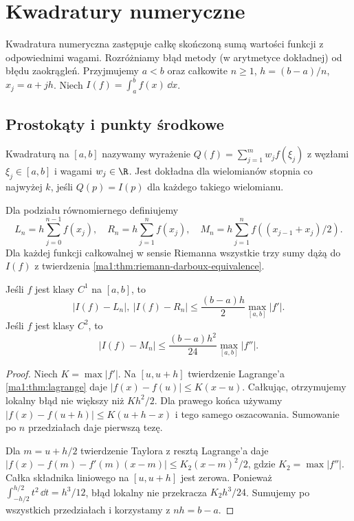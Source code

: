 \chapter{Kwadratury numeryczne}
\label{ma1:ch:numerical-quadrature}

Kwadratura numeryczna zastępuje całkę skończoną sumą wartości funkcji z odpowiednimi wagami. Rozróżniamy błąd metody (w arytmetyce dokładnej) od błędu zaokrągleń. Przyjmujemy $a<b$ oraz całkowite $n\ge1$, $h=(b-a)/n$, $x_j=a+jh$. Niech $I(f)=\int_a^b f(x)\,\dd x$.

\section{Prostokąty i punkty środkowe}
\begin{definicja}
\label{ma1:def:quadrature}
Kwadraturą na $[a,b]$ nazywamy wyrażenie $Q(f)=\sum_{j=1}^m w_j f(\xi_j)$ z węzłami $\xi_j\in[a,b]$ i wagami $w_j\in\R$. Jest dokładna dla wielomianów stopnia co najwyżej $k$, jeśli $Q(p)=I(p)$ dla każdego takiego wielomianu.
\end{definicja}
Dla podziału równomiernego definiujemy
\[
 L_n=h\sum_{j=0}^{n-1} f(x_j),\quad
 R_n=h\sum_{j=1}^n f(x_j),\quad
 M_n=h\sum_{j=1}^n f((x_{j-1}+x_j)/2).
\]
Dla każdej funkcji całkowalnej w sensie Riemanna wszystkie trzy sumy dążą do $I(f)$ z twierdzenia \ref{ma1:thm:riemann-darboux-equivalence}.
\begin{twierdzenie}
\label{ma1:thm:rectangle-error}
Jeśli $f$ jest klasy $C^1$ na $[a,b]$, to
\[
 |I(f)-L_n|,\ |I(f)-R_n|\le \frac{(b-a)h}{2}\max_{[a,b]}|f'|.
\]
Jeśli $f$ jest klasy $C^2$, to
\[
 |I(f)-M_n|\le\frac{(b-a)h^2}{24}\max_{[a,b]}|f''|.
\]
\end{twierdzenie}
\begin{proof}
Niech $K=\max|f'|$. Na $[u,u+h]$ twierdzenie Lagrange'a \ref{ma1:thm:lagrange} daje $|f(x)-f(u)|\le K(x-u)$. Całkując, otrzymujemy lokalny błąd nie większy niż $Kh^2/2$. Dla prawego końca używamy $|f(x)-f(u+h)|\le K(u+h-x)$ i tego samego oszacowania. Sumowanie po $n$ przedziałach daje pierwszą tezę.

Dla $m=u+h/2$ twierdzenie Taylora z resztą Lagrange'a daje $|f(x)-f(m)-f'(m)(x-m)|\le K_2(x-m)^2/2$, gdzie $K_2=\max|f''|$. Całka składnika liniowego na $[u,u+h]$ jest zerowa. Ponieważ $\int_{-h/2}^{h/2}t^2\,\dd t=h^3/12$, błąd lokalny nie przekracza $K_2h^3/24$. Sumujemy po wszystkich przedziałach i korzystamy z $nh=b-a$.
\end{proof}

